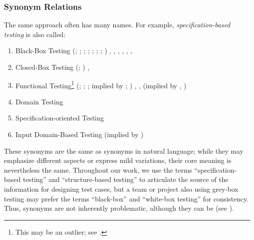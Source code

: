 \subsubsection{Synonym Relations}
\label{syn-rels}

The same approach often has many names. For example,
\emph{specification-based testing} is also called:
\begin{enumerate}
    \item Black-Box Testing
          \ifnotpaper
              (\citealp[p.~9]{IEEE2022}; \citeyear[p.~8]{IEEE2021};
              \citeyear[p.~431]{IEEE2017}; \citealp[p.~5\=/10]{SWEBOK2024};
              \citealpISTQB{}; \citealp[p.~46 (without hyphen)]{Firesmith2015};
              \citealp[p.~344]{SakamotoEtAl2013}; \citealp[p.~399]{vanVliet2000})
          \else
              \cite[p.~9]{IEEE2022}, \cite{ISTQB}, \cite[p.~431]{IEEE2017},
              \cite[p.~5\=/10]{SWEBOK2024}, \cite[p.~8]{IEEE2021},
              \cite[p.~399]{vanVliet2000},
              \cite[p.~344]{SakamotoEtAl2013}
          \fi
    \item Closed-Box Testing
          \ifnotpaper
              (\citealp[p.~9]{IEEE2022}; \citeyear[p.~431]{IEEE2017})
          \else
              \cite[p.~9]{IEEE2022}, \cite[p.~431]{IEEE2017}
          \fi
    \item Functional Testing\footnote{This may be an outlier; see
              .}
          \ifnotpaper
              (\citealp[p.~196]{IEEE2017}; \citealp[p.~44]{Kam2008};
              \citealp[p.~399]{vanVliet2000}; implied by
              \citealp[p.~129]{IEEE2021}; \citeyear[p.~431]{IEEE2017})
          \else
              \cite[p.~196]{IEEE2017}, \cite[p.~399]{vanVliet2000},
              \cite[p.~44]{Kam2008} (implied by \cite[p.~431]{IEEE2017},
              \cite[p.~129]{IEEE2021})
          \fi
    \item Domain Testing \citep[p.~5\=/10]{SWEBOK2024}
    \item Specification-oriented Testing \citep[p.~440, Fig.~12.2]{PetersAndPedrycz2000}
    \item Input Domain-Based Testing (implied by \citealp[pp.~4\=/7 to
              4\=/8]{SWEBOK2014})
\end{enumerate}

These synonyms are the same as synonyms in natural language; while they may
emphasize different aspects or express mild variations, their core meaning
is nevertheless the same. Throughout our work, we use the terms
``specification-based testing'' and ``structure-based testing'' to articulate
the source of the information for designing test cases, but a team or project
also using grey-box testing may prefer the terms ``black-box'' and ``white-box
testing'' for consistency. Thus, synonyms are not inherently problematic,
although they can be (see ).

